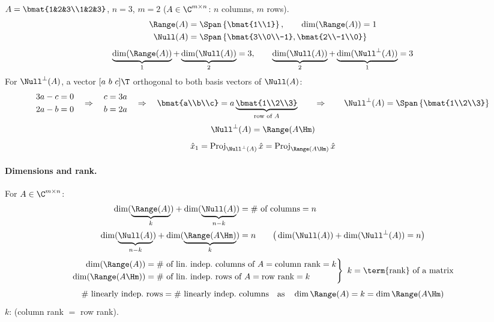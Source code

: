 \begin{example}
$A=\bmat{1&2&3\\1&2&3}$, \qquad $n=3$, $m=2$ \quad ($A\in\C^{m\times n}$: $n$ columns, $m$ rows).
\begin{align*}
\Range(A)&=\Span\left\{\bmat{1\\1}\right\}, \qquad \dim(\Range(A))=1\\
\Null(A)&=\Span\left\{\bmat{3\\0\\-1},\bmat{2\\-1\\0}\right\}
\end{align*}
\[
\underbrace{\dim(\Range(A))}_{1}+\underbrace{\dim(\Null(A))}_{2}=3,
\qquad
\underbrace{\dim(\Null(A))}_{2}+\underbrace{\dim(\Null^\perp(A))}_{1}=3
\]
For $\Null^\perp(A)$, a vector $[a\ b\ c]\T$ orthogonal to both basis vectors of $\Null(A)$:
\[
\begin{aligned}3a-c&=0\\2a-b&=0\end{aligned}
\quad\Rightarrow\quad
\begin{aligned}c&=3a\\b&=2a\end{aligned}
\quad\Rightarrow\quad \bmat{a\\b\\c}=a\underbrace{\bmat{1\\2\\3}}_{\text{row of }A}
\qquad\Rightarrow\qquad
\Null^\perp(A)=\Span\left\{\bmat{1\\2\\3}\right\}
\]
\[
\Null^\perp(A)=\Range(A\Hm)
\]
\[
\hat{x}_1=\operatorname{Proj}_{\Null^\perp(A)}\hat{x}
=\operatorname{Proj}_{\Range(A\Hm)}\hat{x}
\]
\end{example}

\paragraph{Dimensions and rank.} For $A\in\C^{m\times n}$:
\begin{align*}
\dim(\underbrace{\Range(A)}_{k})+\dim(\underbrace{\Null(A)}_{n-k}) &= \#\text{ of columns}=n\\
\dim(\underbrace{\Null(A)}_{n-k})+\dim(\underbrace{\Range(A\Hm)}_{k})&=n
\qquad \big(\dim(\Null(A))+\dim(\Null^\perp(A))=n\big)
\end{align*}
\[
\left.\begin{aligned}
\dim(\Range(A))&=\#\text{ of lin.\ indep.\ columns of }A=\text{column rank}=k\\
\dim(\Range(A\Hm))&=\#\text{ of lin.\ indep.\ rows of }A=\text{row rank}=k
\end{aligned}\right\}\ k=\text{\term{rank} of a matrix}
\]
\[
\#\text{ linearly indep.\ rows}=\#\text{ linearly indep.\ columns}
\quad\text{as}\quad \dim\Range(A)=k=\dim\Range(A\Hm)
\]
$k$:  (column rank $=$ row rank).

